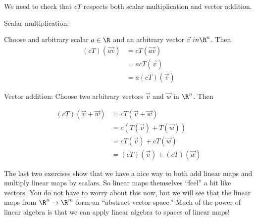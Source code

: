 \documentclass{ximera}
\begin{document}
\begin{free-response}
We need to check that $cT$ respects both scalar multiplication and vector addition.
 
 Scalar multiplication:
 
 Choose and arbitrary scalar $a \in \R$ and an arbitrary vector $\vec{v} \ in \R^n$.  Then
 	\begin{align*}
 		(cT)(\vec{av}) &= cT(\vec{av})\\
 		&= acT(\vec{v})\\
 		&=a(cT)(\vec{v})
 	\end{align*}
 	
 	Vector addition:
 	Choose two arbitrary vectors $\vec{v}$ and $\vec{w}$ in $\R^n$.  Then
 	
 	\begin{align*}
 		(cT)(\vec{v}+\vec{w}) &= cT(\vec{v}+\vec{w})\\
 		&= c\left(T(\vec{v})+T(\vec{w})\right)\\
 		&=cT(\vec{v})+cT(\vec{w})\\
 		&=(cT)(\vec{v})+(cT)(\vec{w})
 	\end{align*}
\end{free-response}


\begin{observation}
  The last two exercises show that we have a nice way to both add
  linear maps and multiply linear maps by scalars.  So linear maps
  themselves ``feel'' a bit like vectors.  You do not have to worry
  about this now, but we will see that the linear maps from $\R^n \to
  \R^m$ form an ``abstract vector space.''  Much of the power of
  linear algebra is that we can apply linear algebra to spaces of
  linear maps!
\end{observation}
	
\end{document}
